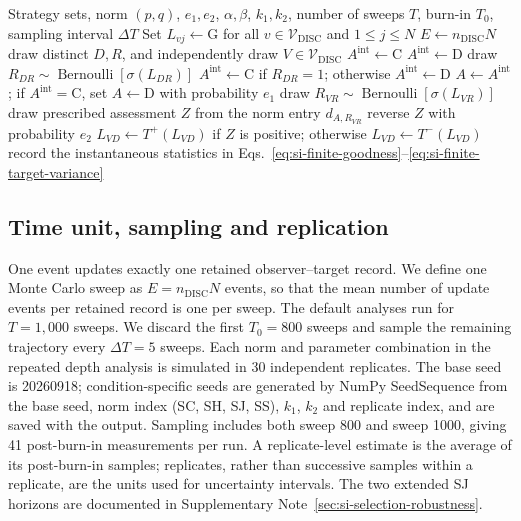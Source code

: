 \documentclass[fleqn,10pt]{wlscirep}
\begin{document}
\begin{algorithm}[htbp]
\caption{Finite-population private-reputation simulation}
\label{alg:si-finite-reputation}
\begin{algorithmic}[1]
\Require Strategy sets, norm $(p,q)$, $e_1,e_2$, $\alpha,\beta$, $k_1,k_2$, number of sweeps $T$, burn-in $T_0$, sampling interval $\Delta T$
\State Set $L_{vj}\gets \mathrm G$ for all $v\in\mathcal V_{\mathrm{DISC}}$ and $1\leq j\leq N$
\State $E\gets n_{\mathrm{DISC}}N$ 
    \State draw distinct $D,R$, and independently draw $V\in\mathcal V_{\mathrm{DISC}}$
        \State $A^{\mathrm{int}}\gets \mathrm C$
        \State $A^{\mathrm{int}}\gets \mathrm D$
    \Else
        \State draw $R_{DR}\sim\operatorname{Bernoulli}[\sigma(L_{DR})]$
        \State $A^{\mathrm{int}}\gets \mathrm C$ if $R_{DR}=1$; otherwise $A^{\mathrm{int}}\gets \mathrm D$
    \EndIf
    \State $A\gets A^{\mathrm{int}}$; if $A^{\mathrm{int}}=\mathrm C$, set $A\gets\mathrm D$ with probability $e_1$
    \State draw $R_{VR}\sim\operatorname{Bernoulli}[\sigma(L_{VR})]$
    \State draw prescribed assessment $Z$ from the norm entry $d_{A,R_{VR}}$
    \State reverse $Z$ with probability $e_2$
    \State $L_{VD}\gets T^+(L_{VD})$ if $Z$ is positive; otherwise $L_{VD}\gets T^-(L_{VD})$
        \State record the instantaneous statistics in Eqs.~\eqref{eq:si-finite-goodness}--\eqref{eq:si-finite-target-variance}
    \EndIf
\EndFor
\end{algorithmic}
\end{algorithm}

\subsection{Time unit, sampling and replication}

One event updates exactly one retained observer--target record. We define one Monte Carlo sweep as $E=n_{\mathrm{DISC}}N$ events, so that the mean number of update events per retained record is one per sweep. The default analyses run for $T=1{,}000$ sweeps. We discard the first $T_0=800$ sweeps and sample the remaining trajectory every $\Delta T=5$ sweeps. Each norm and parameter combination in the repeated depth analysis is simulated in 30 independent replicates. The base seed is 20260918; condition-specific seeds are generated by NumPy SeedSequence from the base seed, norm index (SC, SH, SJ, SS), $k_1$, $k_2$ and replicate index, and are saved with the output. Sampling includes both sweep 800 and sweep 1000, giving 41 post-burn-in measurements per run. A replicate-level estimate is the average of its post-burn-in samples; replicates, rather than successive samples within a replicate, are the units used for uncertainty intervals. The two extended SJ horizons are documented in Supplementary Note~\ref{sec:si-selection-robustness}.
\end{document}
